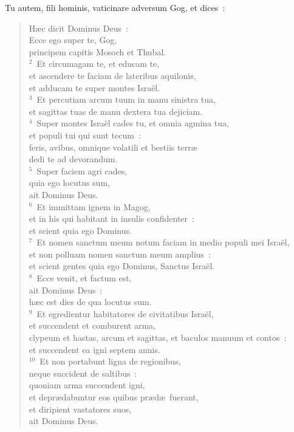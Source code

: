 \bchapter
\lettrine[lines=3,image=true,loversize=0.05,lraise=-0.03]{T}{}u autem, fili hominis, vaticinare adversum Gog, et dices~: \begin{flushleft}\begin{verse}\vspace{6pt}H\ae c dicit Dominus Deus~:\\ Ecce ego super te, Gog,\\ principem capitis Mosoch et Thubal.\\
${}^{2}$~Et circumagam te, et educam te,\\ et ascendere te faciam de lateribus aquilonis,\\ et adducam te super montes Isra\"el.\\
${}^{3}$~Et percutiam arcum tuum in manu sinistra tua,\\ et sagittas tuas de manu dextera tua dejiciam.\\
${}^{4}$~Super montes Isra\"el cades tu, et omnia agmina tua,\\ et populi tui qui sunt tecum~:\\ feris, avibus, omnique volatili et bestiis terr\ae \\ dedi te ad devorandum.\\
${}^{5}$~Super faciem agri cades,\\ quia ego locutus sum,\\ ait Dominus Deus.\\
${}^{6}$~Et immittam ignem in Magog,\\ et in his qui habitant in insulis confidenter~:\\ et scient quia ego Dominus.\\
${}^{7}$~Et nomen sanctum meum notum faciam in medio populi mei Isra\"el,\\ et non polluam nomen sanctum meum amplius~:\\ et scient gentes quia ego Dominus, Sanctus Isra\"el.\\
${}^{8}$~Ecce venit, et factum est,\\ ait Dominus Deus~:\\ h\ae c est dies de qua locutus sum.\\
${}^{9}$~Et egredientur habitatores de civitatibus Isra\"el,\\ et succendent et comburent arma,\\ clypeum et hastas, arcum et sagittas, et baculos manuum et contos~:\\ et succendent ea igni septem annis.\\
${}^{10}$~Et non portabunt ligna de regionibus,\\ neque succident de saltibus~:\\ quoniam arma succendent igni,\\ et depr\ae dabuntur eos quibus pr\ae d\ae\ fuerant,\\ et diripient vastatores suos,\\ ait Dominus Deus.\end{verse}\end{flushleft}


